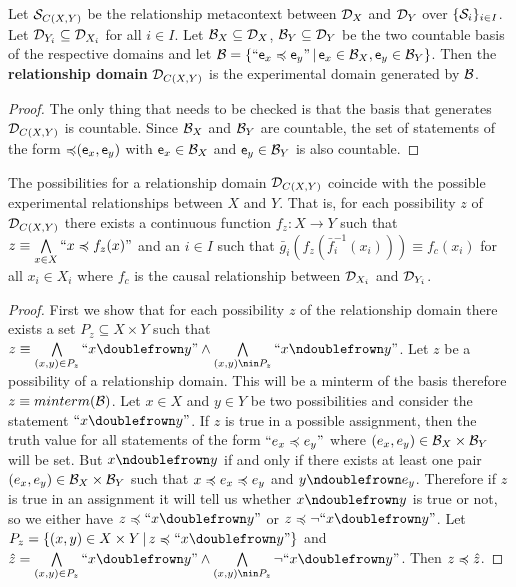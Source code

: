 \documentclass[11pt,letterpaper,fleqn]{memoir} %
\begin{document}
\begin{mathSection}
	\begin{defn}
		Let $\logCtx_{C(X,Y)}$ be the relationship metacontext between $\edomain_X$ and $\edomain_Y$ over $\{ \logCtx_i \}_{i \in I}$. Let $\edomain_{Y_i} \subseteq \edomain_{X_i}$ for all $i \in I$. Let $\basis_X \subseteq \edomain_X$,  $\basis_Y \subseteq \edomain_Y$ be the two countable basis of the respective domains and let $\basis = \{ ``\stmt[e]_x \narrower \stmt[e]_y" \, | \,  \stmt[e]_x \in \basis_X, \stmt[e]_y \in \basis_Y\}$. Then the \textbf{relationship domain} $\edomain_{C(X,Y)}$ is the experimental domain generated by $\basis$.
	\end{defn}
	\begin{proof}
		The only thing that needs to be checked is that the basis that generates $\edomain_{C(X,Y)}$ is countable. Since $\basis_X$ and $\basis_Y$ are countable, the set of statements of the form $\mathbin{\narrower}(\stmt[e]_x, \stmt[e]_y)$ with $\stmt[e]_x \in \basis_X$ and $ \stmt[e]_y \in \basis_Y$ is also countable.
	\end{proof}
\begin{prop}\label{2_prop_relationship_domain_is_space_of_continuous_functions}
	The possibilities for a relationship domain $\edomain_{C(X,Y)}$ coincide with the possible experimental relationships between $X$ and $Y$. That is, for each possibility $z$ of $\edomain_{C(X,Y)}$ there exists a continuous function $f_z : X \to Y$ such that $z\equiv\bigAND\limits_{x\in X} ``x \narrower f_z(x)"$ and an $i \in I$ such that $\bar{g}_i(f_z(\bar{f}_i^{-1}(x_i))) \equiv f_c (x_i)$ for all $x_i \in X_i$ where $f_c$ is the causal relationship between $\edomain_{X_i}$ and $\edomain_{Y_i}$.
\end{prop}
\begin{proof}
	First we show that for each possibility $z$ of the relationship domain there exists a set $P_z \subseteq X \times Y$ such that $z \equiv \bigAND\limits_{(x,y) \in P_z} ``x \comp y"  \AND \bigAND\limits_{(x,y) \nin P_z} ``x \ncomp y"$. Let $z$ be a possibility of a relationship domain. This will be a minterm of the basis therefore $z \equiv minterm(\basis)$. Let $x \in X$ and $y \in Y$ be two possibilities and consider the statement $``x \comp y"$. If $z$ is true in a possible assignment, then the truth value for all statements of the form $``e_x \narrower e_y"$ where $(e_x, e_y) \in \basis_X \times \basis_Y$ will be set. But $x \ncomp y$ if and only if there exists at least one pair $(e_x, e_y) \in \basis_X \times \basis_Y$ such that $x \narrower e_x \narrower e_y$ and $y \ncomp e_y$. Therefore if $z$ is true in an assignment it will tell us whether $x \ncomp y$ is true or not, so we either have $z \narrower ``x \comp y"$ or $z \narrower \NOT ``x \comp y"$. Let $P_z = \{ (x,y) \in X \times Y \, | \, z \narrower ``x \comp y" \}$ and $\hat{z} = \bigAND\limits_{(x,y) \in P_z} ``x \comp y" \AND  \bigAND\limits_{(x,y) \nin P_z} \NOT ``x \comp y" $. Then $z \narrower \hat{z}$.
	

\end{proof}
\end{mathSection}
\end{document}
